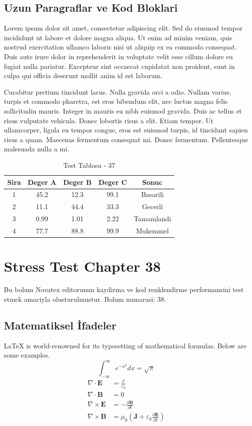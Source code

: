 \documentclass[12pt,a4paper]{article}
\begin{document}
\subsection{Uzun Paragraflar ve Kod Bloklari}
Lorem ipsum dolor sit amet, consectetur adipiscing elit. Sed do eiusmod tempor incididunt ut labore et dolore magna aliqua. Ut enim ad minim veniam, quis nostrud exercitation ullamco laboris nisi ut aliquip ex ea commodo consequat. Duis aute irure dolor in reprehenderit in voluptate velit esse cillum dolore eu fugiat nulla pariatur. Excepteur sint occaecat cupidatat non proident, sunt in culpa qui officia deserunt mollit anim id est laborum.

Curabitur pretium tincidunt lacus. Nulla gravida orci a odio. Nullam varius, turpis et commodo pharetra, est eros bibendum elit, nec luctus magna felis sollicitudin mauris. Integer in mauris eu nibh euismod gravida. Duis ac tellus et risus vulputate vehicula. Donec lobortis risus a elit. Etiam tempor. Ut ullamcorper, ligula eu tempor congue, eros est euismod turpis, id tincidunt sapien risus a quam. Maecenas fermentum consequat mi. Donec fermentum. Pellentesque malesuada nulla a mi.

\begin{table}[h!]
\centering
\begin{tabular}{|c|c|c|c|c|}
\hline
\textbf{Sira} & \textbf{Deger A} & \textbf{Deger B} & \textbf{Deger C} & \textbf{Sonuc} \\
\hline
1 & 45.2 & 12.3 & 99.1 & Basarili \\
2 & 11.1 & 44.4 & 33.3 & Gecerli \\
3 & 0.99 & 1.01 & 2.22 & Tamamlandi \\
4 & 77.7 & 88.8 & 99.9 & Mukemmel \\
\hline
\end{tabular}
\caption{Test Tablosu - 37}
\end{table}

\newpage
\section{Stress Test Chapter 38}
Bu bolum Novatex editorunun kaydirma ve kod renklendirme performansini test etmek amaciyla olusturulmustur. Bolum numarasi: 38.

\subsection{Matematiksel İfadeler}
\LaTeX{} is world-renowned for its typesetting of mathematical formulas. Below are some examples.
\begin{equation}
\int_{-\infty}^{\infty} e^{-x^2} dx = \sqrt{\pi}
\end{equation}
\begin{align}
\nabla \cdot \mathbf{E} &= \frac{\rho}{\varepsilon_0} \\
\nabla \cdot \mathbf{B} &= 0 \\
\nabla \times \mathbf{E} &= -\frac{\partial \mathbf{B}}{\partial t} \\
\nabla \times \mathbf{B} &= \mu_0\left(\mathbf{J} + \varepsilon_0 \frac{\partial \mathbf{E}}{\partial t}\right)
\end{align}
\end{document}
